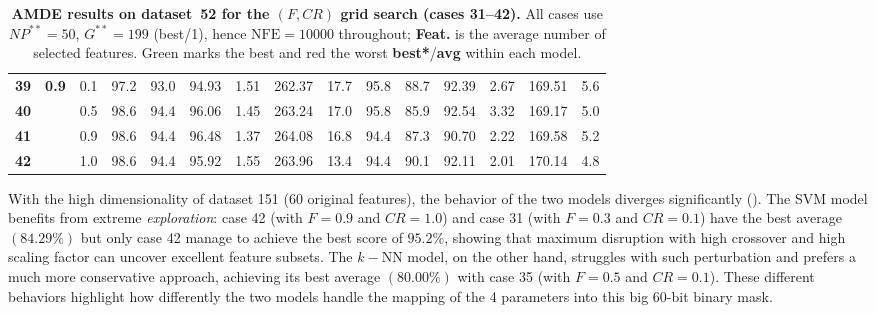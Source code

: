 \documentclass[12pt, openany]{article}
\begin{document}
\begin{table}[H]
{\begin{tabular}{|c c c | c c c c c c | c c c c c c |}
        \hdashline
        \textbf{39} & \multirow{4}{*}{\textbf{0.9}} & 0.1 & \cellcolor{worst}97.2 & 93.0 & \cellcolor{worst}94.93 & 1.51 & 262.37 & 17.7 & \cellcolor{best}95.8 & 88.7 & 92.39 & 2.67 & 169.51 & 5.6 \\
        \textbf{40} &  & 0.5 & \cellcolor{best}98.6 & 94.4 & 96.06 & 1.45 & 263.24 & 17.0 & \cellcolor{best}95.8 & 85.9 & 92.54 & 3.32 & 169.17 & 5.0 \\
        \textbf{41} &  & 0.9 & \cellcolor{best}98.6 & 94.4 & \cellcolor{best}96.48 & 1.37 & 264.08 & 16.8 & \cellcolor{worst}94.4 & 87.3 & 90.70 & 2.22 & 169.58 & 5.2 \\
        \textbf{42} &  & 1.0 & \cellcolor{best}98.6 & 94.4 & 95.92 & 1.55 & 263.96 & 13.4 & \cellcolor{worst}94.4 & 90.1 & 92.11 & 2.01 & 170.14 & 4.8 \\
        \hline
    \end{tabular}
    }
    \caption{\textbf{AMDE results on dataset~52 for the $(F, CR)$ grid search (cases 31--42).} All cases use $NP^{**}{=}50$, $G^{**}{=}199$ (best/1), hence $\mathrm{NFE}=10000$ throughout; \textbf{Feat.} is the average number of selected features. Green marks the best and red the worst \textbf{best*}/\textbf{avg} within each model.}
    \label{tab:results_AMDE_FCR_d52}
\end{table}

With the high dimensionality of dataset 151 (60 original features), the behavior of the two models diverges significantly (). The SVM model benefits from extreme \emph{exploration}: case 42 (with $F=0.9$ and $CR=1.0$) and case 31 (with $F=0.3$ and $CR=0.1$) have the best average $(84.29\%)$ but only case 42 manage to achieve the best score of $95.2\%$, showing that maximum disruption with high crossover and high scaling factor can uncover excellent feature subsets. The $k-$NN model, on the other hand, struggles with such perturbation and prefers a much more conservative approach, achieving its best average $(80.00\%)$ with case 35 (with $F=0.5$ and $CR=0.1$). These different behaviors highlight how differently the two models handle the mapping of the 4 parameters into this big 60-bit binary mask.
\end{document}
